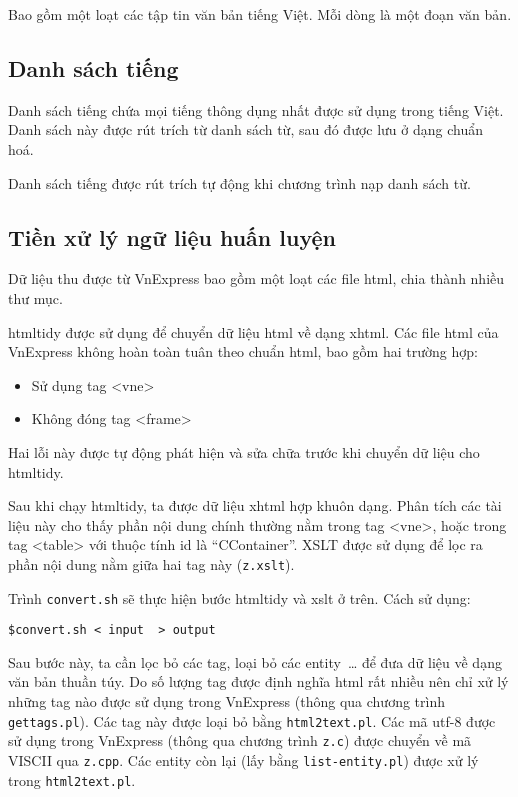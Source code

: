 \documentclass[a4paper,oneside,14pt]{extbook} %
\begin{document}
Bao gồm một loạt các tập tin văn bản tiếng Việt. Mỗi dòng là một đoạn
văn bản.

\subsection{Danh sách tiếng}
\label{sub:syllable-list}

Danh sách tiếng chứa mọi tiếng thông dụng nhất được sử dụng trong
tiếng Việt. Danh sách này được rút trích từ danh sách từ, sau đó được
lưu ở dạng chuẩn hoá.

Danh sách tiếng được rút trích tự động khi chương trình nạp danh sách
từ.



\subsection{Tiền xử lý ngữ liệu huấn luyện}
\label{sec:training-data-preprocessing}

Dữ liệu thu được từ VnExpress bao gồm một loạt các file html, chia
thành nhiều thư mục.

htmltidy được sử dụng để chuyển dữ liệu html về dạng xhtml. Các file
html của VnExpress không hoàn toàn tuân theo chuẩn html, bao gồm hai
trường hợp:

\begin{itemize}
\item Sử dụng tag <vne>
\item Không đóng tag <frame>
\end{itemize}

Hai lỗi này được tự động phát hiện và sửa chữa trước khi chuyển dữ
liệu cho htmltidy.

Sau khi chạy htmltidy, ta được dữ liệu xhtml hợp khuôn dạng. Phân tích
các tài liệu này cho thấy phần nội dung chính thường nằm trong tag
<vne>, hoặc trong tag <table> với thuộc tính id là
``CContainer''. XSLT được sử dụng để lọc ra phần nội dung nằm giữa hai
tag này (\verb#z.xslt#).

Trình \verb#convert.sh# sẽ thực hiện bước htmltidy và xslt ở trên. Cách sử
dụng:
\begin{verbatim}
$convert.sh < input  > output
\end{verbatim}

Sau bước này, ta cần lọc bỏ các tag, loại bỏ các entity~\ldots{}{} để
đưa dữ liệu về dạng văn bản thuần túy. Do số lượng tag được định nghĩa
html rất nhiều nên chỉ xử lý những tag nào được sử dụng trong
VnExpress (thông qua chương trình \verb#gettags.pl#). Các tag này được loại
bỏ bằng \verb#html2text.pl#. Các mã utf-8 được sử dụng trong
VnExpress (thông qua chương trình \verb#z.c#) được chuyển về mã VISCII
qua \verb#z.cpp#. Các entity còn lại (lấy bằng \verb#list-entity.pl#)
được xử lý trong \verb#html2text.pl#.
\end{document}
